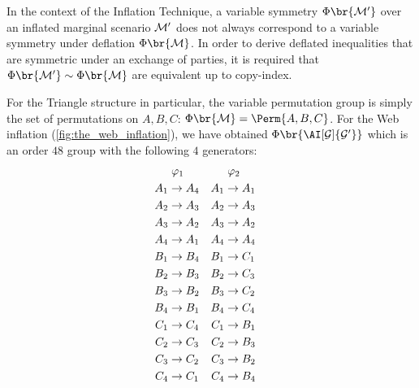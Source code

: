 \documentclass[aps, 10pt, english, twoside, pra, nofootinbib, tightenlines, longbibliography, superscriptaddress]{revtex4-1}
\begin{document}
    In the context of the Inflation Technique, a variable symmetry $\Phi\br{\mscenario'}$ over an inflated marginal scenario $\mathcal{M}'$ does not always correspond to a variable symmetry under deflation $\Phi\br{\mscenario}$. In order to derive deflated inequalities that are symmetric under an exchange of parties, it is required that $\Phi\br{\mscenario'} \sim \Phi\br{\mscenario}$ are equivalent up to copy-index.

    For the Triangle structure in particular, the variable permutation group is simply the set of permutations on $A, B, C$: $\Phi\br{\mscenario} = \Perm{A, B, C}$. For the Web inflation (\cref{fig:the_web_inflation}), we have obtained $\gp\br{\AI[\graph]{\graph'}}$ which is an order $48$ group with the following $4$ generators:
    \begin{equation*}
    \begin{aligned}[c]
    &\hspace{1mm}\varphi_1 \\
    A_1 &\to A_4 \\A_2 &\to A_3 \\A_3 &\to A_2 \\A_4 &\to A_1 \\B_1 &\to B_4 \\B_2 &\to B_3 \\B_3 &\to B_2 \\B_4 &\to B_1 \\C_1 &\to C_4 \\C_2 &\to C_3 \\C_3 &\to C_2 \\C_4 &\to C_1
    \end{aligned}
    \quad
    \begin{aligned}[c]
    &\hspace{1mm}\varphi_2 \\
    A_1 &\to A_1 \\A_2 &\to A_3 \\A_3 &\to A_2 \\A_4 &\to A_4 \\B_1 &\to C_1 \\B_2 &\to C_3 \\B_3 &\to C_2 \\B_4 &\to C_4 \\C_1 &\to B_1 \\C_2 &\to B_3 \\C_3 &\to B_2 \\C_4 &\to B_4
    \end{aligned}
    \quad
    \begin{aligned}[c]

\end{aligned}
\end{equation*}
\end{document}
